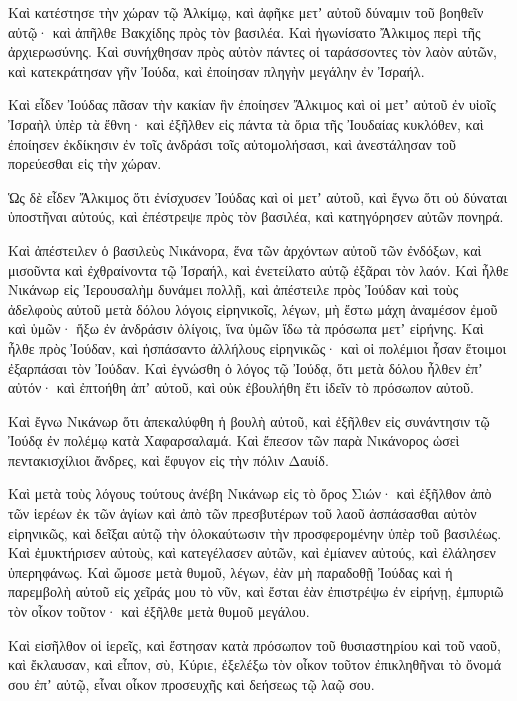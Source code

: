 {Καὶ κατέστησε τὴν χώραν τῷ Ἀλκίμῳ, καὶ ἀφῆκε μετʼ αὐτοῦ δύναμιν τοῦ βοηθεῖν αὐτῷ· καὶ ἀπῆλθε Βακχίδης πρὸς τὸν βασιλέα.
Καὶ ἠγωνίσατο Ἄλκιμος περὶ τῆς ἀρχιερωσύνης.
Καὶ συνήχθησαν πρὸς αὐτὸν πάντες οἱ ταράσσοντες τὸν λαὸν αὐτῶν, καὶ κατεκράτησαν γῆν Ἰούδα, καὶ ἐποίησαν πληγὴν μεγάλην ἐν Ἰσραήλ.
\par }{\PP {}Καὶ εἶδεν Ἰούδας πᾶσαν τὴν κακίαν ἣν ἐποίησεν Ἄλκιμος καὶ οἱ μετʼ αὐτοῦ ἐν υἱοῖς Ἰσραὴλ ὑπὲρ τὰ ἔθνη·
καὶ ἐξῆλθεν εἰς πάντα τὰ ὅρια τῆς Ἰουδαίας κυκλόθεν, καὶ ἐποίησεν ἐκδίκησιν ἐν τοῖς ἀνδράσι τοῖς αὐτομολήσασι, καὶ ἀνεστάλησαν τοῦ πορεύεσθαι εἰς τὴν χώραν.
\par }{\PP {}Ὡς δὲ εἶδεν Ἄλκιμος ὅτι ἐνίσχυσεν Ἰούδας καὶ οἱ μετʼ αὐτοῦ, καὶ ἔγνω ὅτι οὐ δύναται ὑποστῆναι αὐτούς, καὶ ἐπέστρεψε πρὸς τὸν βασιλέα, καὶ κατηγόρησεν αὐτῶν πονηρά.
\par }{\PP {}Καὶ ἀπέστειλεν ὁ βασιλεὺς Νικάνορα, ἕνα τῶν ἀρχόντων αὐτοῦ τῶν ἐνδόξων, καὶ μισοῦντα καὶ ἐχθραίνοντα τῷ Ἰσραήλ, καὶ ἐνετείλατο αὐτῷ ἐξᾶραι τὸν λαόν.
Καὶ ἦλθε Νικάνωρ εἰς Ἰερουσαλὴμ δυνάμει πολλῇ, καὶ ἀπέστειλε πρὸς Ἰούδαν καὶ τοὺς ἀδελφοὺς αὐτοῦ μετὰ δόλου λόγοις εἰρηνικοῖς, λέγων,
μὴ ἔστω μάχη ἀναμέσον ἐμοῦ καὶ ὑμῶν· ἥξω ἐν ἀνδράσιν ὀλίγοις, ἵνα ὑμῶν ἴδω τὰ πρόσωπα μετʼ εἰρήνης.
Καὶ ἦλθε πρὸς Ἰούδαν, καὶ ἠσπάσαντο ἀλλήλους εἰρηνικῶς· καὶ οἱ πολέμιοι ἦσαν ἕτοιμοι ἐξαρπάσαι τὸν Ἰούδαν.
Καὶ ἐγνώσθη ὁ λόγος τῷ Ἰούδᾳ, ὅτι μετὰ δόλου ἦλθεν ἐπʼ αὐτόν· καὶ ἐπτοήθη ἀπʼ αὐτοῦ, καὶ οὐκ ἐβουλήθη ἔτι ἰδεῖν τὸ πρόσωπον αὐτοῦ.
\par }{\PP {}Καὶ ἔγνω Νικάνωρ ὅτι ἀπεκαλύφθη ἡ βουλὴ αὐτοῦ, καὶ ἐξῆλθεν εἰς συνάντησιν τῷ Ἰούδᾳ ἐν πολέμῳ κατὰ Χαφαρσαλαμά.
Καὶ ἔπεσον τῶν παρὰ Νικάνορος ὡσεὶ πεντακισχίλιοι ἄνδρες, καὶ ἔφυγον εἰς τὴν πόλιν Δαυίδ.
\par }{\PP {}Καὶ μετὰ τοὺς λόγους τούτους ἀνέβη Νικάνωρ εἰς τὸ ὄρος Σιών· καὶ ἐξῆλθον ἀπὸ τῶν ἱερέων ἐκ τῶν ἁγίων καὶ ἀπὸ τῶν πρεσβυτέρων τοῦ λαοῦ ἀσπάσασθαι αὐτὸν εἰρηνικῶς, καὶ δεῖξαι αὐτῷ τὴν ὁλοκαύτωσιν τὴν προσφερομένην ὑπὲρ τοῦ βασιλέως.
Καὶ ἐμυκτήρισεν αὐτοὺς, καὶ κατεγέλασεν αὐτῶν, καὶ ἐμίανεν αὐτούς, καὶ ἐλάλησεν ὑπερηφάνως.
Καὶ ὤμοσε μετὰ θυμοῦ, λέγων, ἐὰν μὴ παραδοθῇ Ἰούδας καὶ ἡ παρεμβολὴ αὐτοῦ εἰς χεῖράς μου τὸ νῦν, καὶ ἔσται ἐὰν ἐπιστρέψω ἐν εἰρήνῃ, ἐμπυριῶ τὸν οἶκον τοῦτον· καὶ ἐξῆλθε μετὰ θυμοῦ μεγάλου.
\par }{\PP {}Καὶ εἰσῆλθον οἱ ἱερεῖς, καὶ ἔστησαν κατὰ πρόσωπον τοῦ θυσιαστηρίου καὶ τοῦ ναοῦ, καὶ ἔκλαυσαν, καὶ εἶπον,
σὺ, Κύριε, ἐξελέξω τὸν οἶκον τοῦτον ἐπικληθῆναι τὸ ὄνομά σου ἐπʼ αὐτῷ, εἶναι οἶκον προσευχῆς καὶ δεήσεως τῷ λαῷ σου.
}
